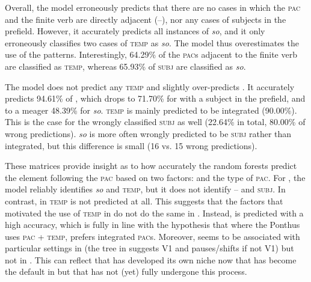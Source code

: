 \documentclass[output=paper,colorlinks,citecolor=brown]{langscibook}
\begin{document}
Overall, the  model erroneously predicts that there are no cases in which the \textsc{pac} and the finite verb are directly adjacent (--), nor any cases of subjects in the prefield. However, it accurately predicts all instances of \textit{so}, and it only erroneously classifies two cases of \textsc{temp} as \textit{so}. The model thus overestimates the use of the  patterns. Interestingly, 64.29\% of the \textsc{pac}s adjacent to the finite verb are classified as \textsc{temp}, whereas 65.93\% of \textsc{subj} are classified as \textit{so}. 

The  model does not predict any \textsc{temp} and slightly over-predicts . It accurately predicts 94.61\% of , which drops to 71.70\% for  with a subject in the prefield, and to a meager 48.39\% for \textit{so}. \textsc{temp} is mainly predicted to be integrated (90.00\%). This is the case for the wrongly classified \textsc{subj} as well (22.64\% in total, 80.00\% of wrong predictions). \textit{so} is more often wrongly predicted to be \textsc{subj} rather than integrated, but this difference is small (16 vs. 15 wrong predictions).

These matrices provide insight as to how accurately the random forests predict the element following the \textsc{pac} based on two factors:  and the type of \textsc{pac}. For , the model reliably identifies \textit{so} and \textsc{temp}, but it does not identify -- and \textsc{subj}. In contrast, in  \textsc{temp} is not predicted at all. This suggests that the factors that motivated the use of \textsc{temp} in  do not do the same in . Instead,  is predicted with a high accuracy, which is fully in line with the hypothesis that where the  Ponthus uses \textsc{pac} + \textsc{temp},  prefers integrated \textsc{pac}s. Moreover,  seems to be associated with particular settings in  (the tree in  suggests V1 and pauses/shifts if not V1) but not in . This can reflect that  has developed its own niche now that  has become the default in  but that  has not (yet) fully undergone this process.
\end{document}
